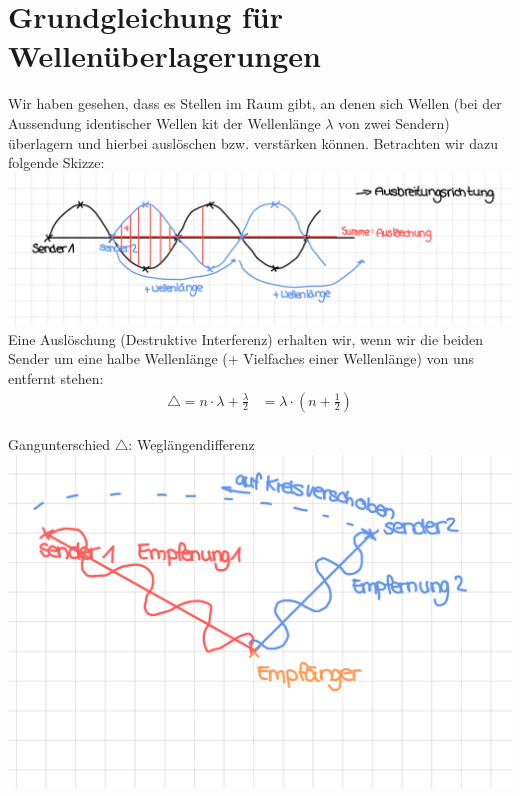\documentclass[12pt,a4paper]{report}
\begin{document}
	\setcounter{section}{12}
	\section{Grundgleichung für Wellenüberlagerungen}
	Wir haben \dq gesehen\dq, dass es Stellen im Raum gibt, an denen sich Wellen (bei der Aussendung identischer Wellen kit der Wellenlänge $\lambda$ von zwei Sendern) überlagern und hierbei auslöschen bzw. verstärken können. Betrachten wir dazu folgende Skizze:\\
	\includegraphics[width=\textwidth]{JPEG-Bild-443E-8313-20-0.JPEG}
	Eine Auslöschung (\dq Destruktive Interferenz\dq) erhalten wir, wenn wir die beiden Sender um eine halbe Wellenlänge (+ Vielfaches einer Wellenlänge) von uns entfernt stehen:
	\begin{align*}
		\bigtriangleup =n \cdot \lambda + \frac{\lambda}{2} &= \lambda \cdot (n+\frac{1}{2})
	\end{align*} \\
	Gangunterschied $\bigtriangleup$: \dq Weglängendifferenz\dq \\
	\includegraphics[width=\textwidth]{JPEG-Bild-4CCB-9E90-7A-0.JPEG}
	
\end{document}
